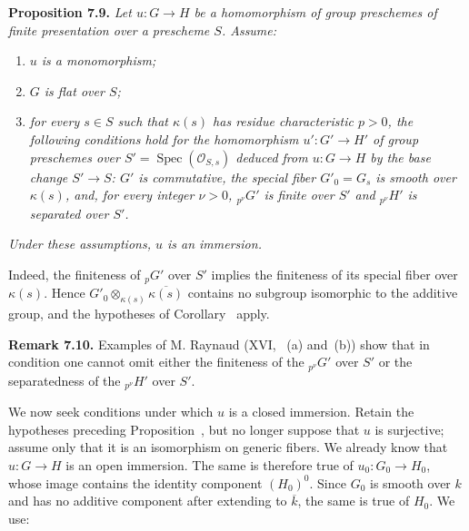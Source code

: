 \medskip
\noindent{}\textbf{Proposition 7.9.}
\textit{Let \(u:G\to H\) be a homomorphism of group preschemes of finite
presentation over a prescheme \(S\). Assume:}
\begin{enumerate}
  \item[(a)]
  \textit{\(u\) is a monomorphism;}
  \item[(b)]
  \textit{\(G\) is flat over \(S\);}
  \item[(c)]
  \textit{for every \(s\in S\) such that \(\kappa(s)\) has residue
  characteristic \(p>0\), the following conditions hold for the homomorphism
  \(u':G'\to H'\) of group preschemes over
  \(S'=\operatorname{Spec}(\mathscr O_{S,s})\) deduced from \(u:G\to H\) by
  the base change \(S'\to S\): \(G'\) is commutative, the special fiber
  \(G'_0=G_s\) is smooth over \(\kappa(s)\), and, for every integer
  \(\nu>0\), \({}_{p^\nu}G'\) is finite over \(S'\) and \({}_{p^\nu}H'\) is
  separated over \(S'\).}
\end{enumerate}
\textit{Under these assumptions, \(u\) is an immersion.}

Indeed, the finiteness of \({}_pG'\) over \(S'\) implies the finiteness of
its special fiber over \(\kappa(s)\). Hence
\(G'_0\otimes_{\kappa(s)}\overline{\kappa(s)}\) contains no subgroup
isomorphic to the additive group, and the hypotheses of
Corollary~ apply.

\medskip
\noindent{}\textbf{Remark 7.10.}
Examples of M. Raynaud (XVI, ~(a) and~(b)) show that in condition  one
cannot omit either the finiteness of the \({}_{p^\nu}G'\) over \(S'\) or
the separatedness of the \({}_{p^\nu}H'\) over \(S'\).

We now seek conditions under which \(u\) is a closed immersion. Retain the
hypotheses preceding Proposition~,
but no longer suppose that \(u\) is surjective; assume only that it is an
isomorphism on generic fibers. We already know that \(u:G\to H\) is an open
immersion. The same is therefore true of \(u_0:G_0\to H_0\), whose image
contains the identity component \((H_0)^0\). Since \(G_0\) is smooth over
\(k\) and has no additive component after extending to \(\overline{k}\),
the same is true of \(H_0\). We use:


